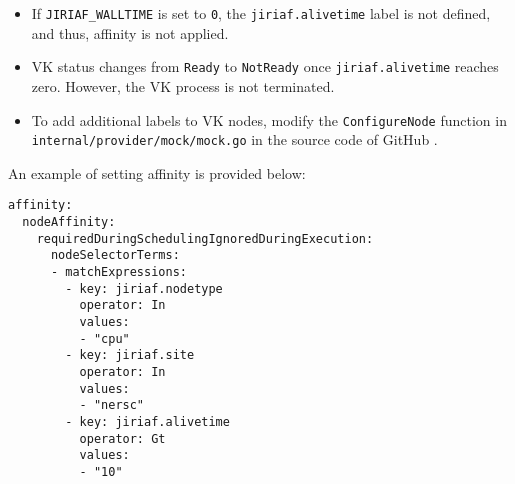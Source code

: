 \begin{itemize}
    \item If \texttt{JIRIAF\_WALLTIME} is set to \texttt{0}, the \texttt{jiriaf.alivetime} label is not defined, and thus, affinity is not applied.
    \item VK status changes from \texttt{Ready} to \texttt{NotReady} once \texttt{jiriaf.alivetime} reaches zero. However, the VK process is not terminated.
    \item To add additional labels to VK nodes, modify the \texttt{ConfigureNode} function in \texttt{internal/provider/mock/mock.go} in the source code of GitHub \cite{virtual-kubelet-cmd}.
\end{itemize}

An example of setting affinity is provided below:

\begin{verbatim}
affinity:
  nodeAffinity:
    requiredDuringSchedulingIgnoredDuringExecution:
      nodeSelectorTerms:
      - matchExpressions:
        - key: jiriaf.nodetype
          operator: In
          values:
          - "cpu"
        - key: jiriaf.site
          operator: In
          values:
          - "nersc"
        - key: jiriaf.alivetime
          operator: Gt
          values:
          - "10"
\end{verbatim}
